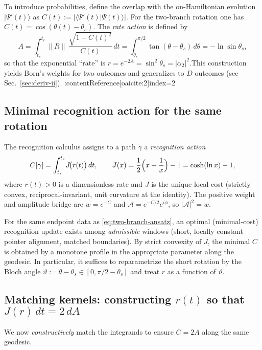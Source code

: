 \documentclass[11pt,letterpaper]{article}
\begin{document}
To introduce probabilities, define the overlap with the on-Hamiltonian evolution \(|\Psi'(t)\rangle\) as \(C(t):=|\langle \Psi'(t)|\Psi(t)\rangle|\). For the two-branch rotation one has \(C(t)=\cos(\theta(t)-\theta_s)\). The \emph{rate action} is defined by
\begin{equation}
A=\int_{t_s}^{t_e}\!\|R\|\,\frac{\sqrt{1-C(t)^2}}{C(t)}\,dt
=\int_{\theta_s}^{\pi/2}\!\tan(\theta-\theta_s)\,d\theta
=-\ln\sin\theta_s,
\label{eq:A-two-branch}
\end{equation}
so that the exponential ``rate'' is \(r=e^{-2A}=\sin^2\theta_s=|\alpha_2|^2\).\;This construction yields Born's weights for two outcomes and generalizes to \(D\) outcomes (see Sec.~\ref{sec:deriv-ii}). :contentReference[oaicite:2]{index=2}

\subsection{Minimal recognition action for the same rotation}

The recognition calculus assigns to a path \(\gamma\) a \emph{recognition action}
\begin{equation}
C[\gamma]=\int_{t_s}^{t_e}\!J\!\bigl(r(t)\bigr)\,dt,
\qquad
J(x)=\frac12\Bigl(x+\frac1x\Bigr)-1=\cosh(\ln x)-1,
\label{eq:C-recogn}
\end{equation}
where \(r(t)>0\) is a dimensionless rate and \(J\) is the unique local cost (strictly convex, reciprocal-invariant, unit curvature at the identity). The positive weight and amplitude bridge are \(w=e^{-C}\) and \(\mathcal A=e^{-C/2}e^{i\phi}\), so \(|\mathcal A|^2=w\).

For the same endpoint data as \eqref{eq:two-branch-ansatz}, an optimal (minimal-cost) recognition update exists among \emph{admissible} windows (short, locally constant pointer alignment, matched boundaries). By strict convexity of \(J\), the minimal \(C\) is obtained by a monotone profile in the appropriate parameter along the geodesic. In particular, it suffices to reparametrize the short rotation by the Bloch angle \(\vartheta:=\theta-\theta_s\in[0,\pi/2-\theta_s]\) and treat \(r\) as a function of \(\vartheta\).

\subsection{Matching kernels: constructing \(r(t)\) so that \(J(r)\,dt=2\,dA\)}

We now \emph{constructively} match the integrands to ensure \(C=2A\) along the same geodesic.
\end{document}
